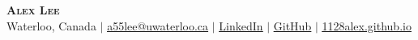 
\begin{center}
    \textbf{\Huge \scshape Alex Lee} \\ \vspace{1pt}
    {Waterloo, Canada} $|$ 
    \href{mailto:a55lee@uwaterloo.ca}{\underline{a55lee@uwaterloo.ca}} $|$ 
    \href{https://www.linkedin.com/in/alex-jiwon-lee/}{\underline{LinkedIn}} $|$
    \href{https://github.com/1128alex}{\underline{GitHub}} $|$ 
    \href{https://1128alex.github.io/alex-lee/}{\underline{1128alex.github.io}}
\end{center}
